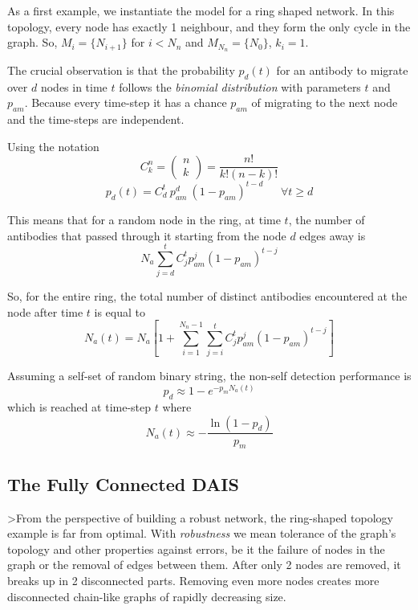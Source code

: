 \documentclass{article}
\begin{document}
As a first example, we instantiate the model for a ring shaped network.
In this topology, every node has exactly 1 neighbour, and they form the only cycle in the graph.
So, $M_i = \{N_{i+1}\}$ for $i<N_n$ and $M_{N_n} = \{N_0\}$, $k_i = 1$.

The crucial observation is that the probability $p_d(t)$ for an antibody to migrate over $d$ nodes in time $t$ follows the {\it binomial distribution} with parameters $t$ and $p_{am}$.
Because every time-step it has a chance $p_{am}$ of migrating to the next node and the time-steps are independent.

Using the notation
$$
  C^n_k = \left( \begin{array}{c} n \\ k  \end{array} \right) = \frac{n!}{k!(n-k)!}
$$
\begin{equation}
  p_d(t) = C^t_d~p_{am}^d~(1-p_{am})^{t-d} ~~~~~~~ \forall t \geq d
\end{equation}

This means that for a random node in the ring, at time $t$, the number of antibodies that passed through it starting from the node $d$ edges away is
\begin{equation}
   N_a  \sum_{j=d}^{t}{ C^t_j p_{am}^j (1-p_{am})^{t-j} }
\end{equation}

So, for the entire ring, the total number of distinct antibodies encountered at the node after time $t$ is equal to 
\begin{equation}
  N_a(t) = N_a[ 1 + \sum_{i=1}^{N_n - 1}\sum_{j=i}^{t}{ C^t_j p_{am}^j (1-p_{am})^{t-j} } ]
\end{equation}

Assuming a self-set of random binary string, the non-self detection performance is
\begin{equation}
  \label{eq_detprob}
  p_d \approx 1 - e^{-p_m N_a(t)} 
\end{equation}
which is reached at time-step $t$ where
\begin{equation}
  N_a(t) \approx -\frac{\ln{(1-p_d)}}{p_m}
\end{equation} 

\subsection{The Fully Connected DAIS}
\label{sec_dais_connected}
>From the perspective of building a robust network, the ring-shaped topology example is far from optimal.
With {\it robustness} we mean tolerance of the graph's topology and other properties against errors, be it the failure of nodes in the graph or the removal of edges between them.
After only 2 nodes are removed, it breaks up in 2 disconnected parts.
Removing even more nodes creates more disconnected chain-like graphs of rapidly decreasing size.
\end{document}
